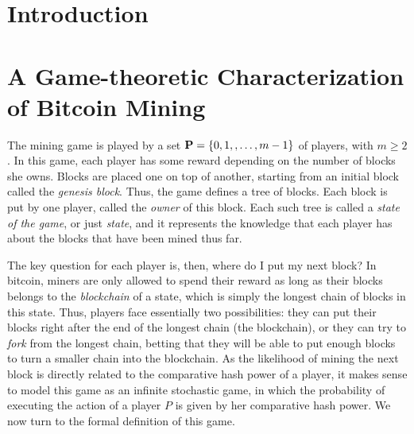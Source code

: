 
\section{Introduction}
\label{sec-intro}

\section{A Game-theoretic Characterization of Bitcoin Mining}
\label{sec-formalization}
The mining game is played by a set $\mathbf{P} = \{0, 1, , \ldots, m-1\}$ of players, with $m \geq 2$. In this game, each player has some reward depending on the number of blocks she owns. Blocks are placed one on top of another, starting from an initial block called the {\em genesis block}. Thus, the game defines a tree of blocks. Each block is put by one player, called the {\em owner} of this block. Each such tree is called a {\em state of the game}, or just {\em state}, and it represents the knowledge that each player has about the blocks that have been mined thus far. 

The key question for each player is, then, where do I put my next block? In bitcoin, miners are only allowed to spend their reward as long 
as their blocks belongs to the \emph{blockchain} of a state, which is simply the longest chain of blocks in this state. Thus, players face essentially two possibilities: they can put their blocks right after the end of the longest chain (the blockchain), or they can try to \emph{fork} 
from the longest chain, betting that they will be able to put enough blocks to turn a smaller chain into the blockchain. As the likelihood of 
mining the next block is directly related to the comparative hash power of a player, it makes sense to model this game as an infinite 
stochastic game, in which the probability of executing the action of a player $P$ is given by her comparative hash power. 
We now turn to the formal definition of this game. 

